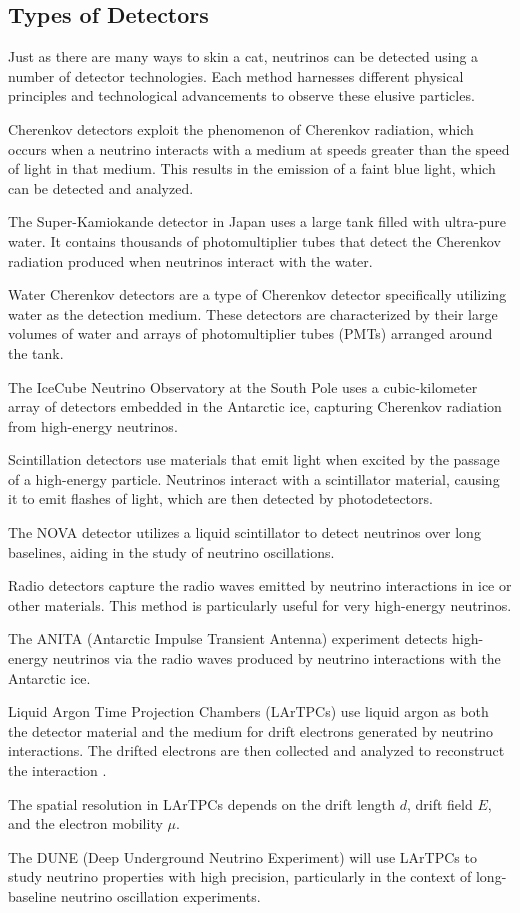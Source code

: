 \subsection{Types of Detectors}

Just as there are many ways to skin a cat, neutrinos can be detected using a number of detector technologies.
Each method harnesses different physical principles and technological advancements to observe these elusive particles.

Cherenkov detectors exploit the phenomenon of Cherenkov radiation, which occurs when a neutrino interacts with a medium at speeds greater than the speed of light in that medium.
This results in the emission of a faint blue light, which can be detected and analyzed.

The Super-Kamiokande detector in Japan uses a large tank filled with ultra-pure water.
It contains thousands of photomultiplier tubes that detect the Cherenkov radiation produced when neutrinos interact with the water.

Water Cherenkov detectors are a type of Cherenkov detector specifically utilizing water as the detection medium.
These detectors are characterized by their large volumes of water and arrays of photomultiplier tubes (PMTs) arranged around the tank.

The IceCube Neutrino Observatory at the South Pole uses a cubic-kilometer array of detectors embedded in the Antarctic ice, capturing Cherenkov radiation from high-energy neutrinos.

Scintillation detectors use materials that emit light when excited by the passage of a high-energy particle.
Neutrinos interact with a scintillator material, causing it to emit flashes of light, which are then detected by photodetectors.

The NOVA detector utilizes a liquid scintillator to detect neutrinos over long baselines, aiding in the study of neutrino oscillations.

Radio detectors capture the radio waves emitted by neutrino interactions in ice or other materials.
This method is particularly useful for very high-energy neutrinos.

The ANITA (Antarctic Impulse Transient Antenna) experiment detects high-energy neutrinos via the radio waves produced by neutrino interactions with the Antarctic ice.

Liquid Argon Time Projection Chambers (LArTPCs) use liquid argon as both the detector material and the medium for drift electrons generated by neutrino interactions.
The drifted electrons are then collected and analyzed to reconstruct the interaction \cite{vonFeilitzsch2012}.

The spatial resolution in LArTPCs depends on the drift length \( d \), drift field \( E \), and the electron mobility \( \mu \).

The DUNE (Deep Underground Neutrino Experiment) will use LArTPCs to study neutrino properties with high precision, particularly in the context of long-baseline neutrino oscillation experiments.

